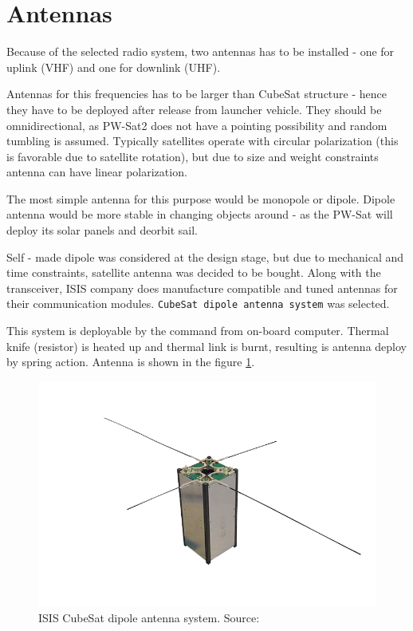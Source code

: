 \section{Antennas}
Because of the selected radio system, two antennas has to be installed - one for uplink (VHF) and one for downlink (UHF).

Antennas for this frequencies has to be larger than CubeSat structure - hence  they have to be deployed after release from launcher vehicle. They should be omnidirectional, as PW-Sat2 does not have a pointing possibility and random tumbling is assumed. Typically satellites operate with circular polarization (this is favorable due to satellite rotation), but due to size and weight constraints antenna can have linear polarization.

The most simple antenna for this purpose would be monopole or dipole. Dipole antenna would be more stable in changing objects around - as the PW-Sat will deploy its solar panels and deorbit sail.

Self - made dipole was considered at the design stage, but due to mechanical and time constraints, satellite antenna was decided to be bought. Along with the transceiver, ISIS company does manufacture compatible and tuned antennas for their communication modules. \texttt{CubeSat dipole antenna system} was selected.

This system is deployable by the command from on-board computer. Thermal knife (resistor) is heated up and thermal link is burnt, resulting is antenna deploy by spring action. Antenna is shown in the figure \ref{ISIS_antenna}.

    \begin{figure}[H]
        \centering
        \includegraphics[width=0.8\paperwidth]{img/3/CubeSat-antenna-dipole-configuration.png}
        \caption{ISIS CubeSat dipole antenna system. Source: \cite{???}}
        \label{ISIS_antenna}
    \end{figure}


